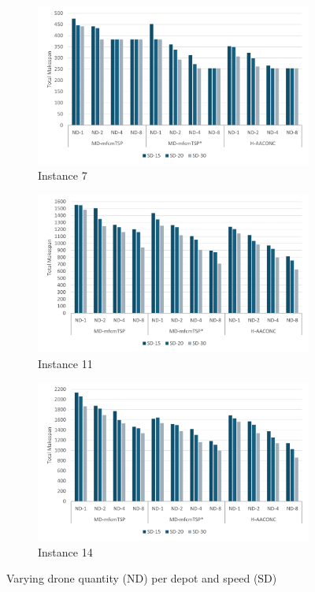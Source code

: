 \documentclass{article}
\begin{document}
	\begin{figure}[h]
		\centering
		\begin{subfigure}{0.33\textwidth}
			\centering
			\includegraphics[scale=0.42]{p07_drones}\;
			\caption{Instance 7}
			\label{fig:p07_drones}
		\end{subfigure}
		\begin{subfigure}{0.33\textwidth}
			\centering
			\includegraphics[scale=0.42]{p11_drones}\;
			\caption{Instance 11}
			\label{fig:p11_drones}
		\end{subfigure}
		\begin{subfigure}{0.33\textwidth}
			\centering
			\includegraphics[scale=0.42]{p33_drones}\;
			\caption{Instance 14}
			\label{fig:p33_drones}
		\end{subfigure}
		\caption{Varying drone quantity (ND) per depot and speed (SD)}
		\label{fig:drone_exp}
	\end{figure}
	
	
	\;
	\;
	\;
	
	\clearpage
	\printbibliography
	
\end{document}
